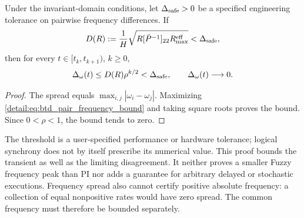 \begin{btdcorollary}
\label{detail:cor:btd_frequency_safety}
Under the invariant-domain conditions, let $\Delta_{\rm safe}>0$ be a
specified engineering tolerance on pairwise frequency differences. If
\begin{equation}
 D(R):=\frac1H\sqrt{R[\bar P^{-1}]_{22}R_{\max}^{\rm eff}}
       <\Delta_{\rm safe},
 \label{detail:eq:btd_frequency_threshold_condition}
\end{equation}
then for every $t\in[t_k,t_{k+1})$, $k\ge0$,
\begin{equation}
 \Delta_\omega(t)\le D(R)\rho^{k/2}<\Delta_{\rm safe},
 \qquad \Delta_\omega(t)\longrightarrow0.
 \label{detail:eq:btd_frequency_decay}
\end{equation}
\end{btdcorollary}
\begin{proof}
The spread equals $\max_{i,j}|\omega_i-\omega_j|$. Maximizing
\eqref{detail:eq:btd_pair_frequency_bound} and taking square roots proves
the bound. Since $0<\rho<1$, the bound tends to zero.
\end{proof}

The threshold is a user-specified performance or hardware tolerance;
logical synchrony does not by itself prescribe its numerical value.
This proof bounds the transient as well as the limiting disagreement.
It neither proves a smaller Fuzzy frequency peak than PI nor adds a
guarantee for arbitrary delayed or stochastic executions. Frequency
spread also cannot certify positive absolute frequency: a collection of
equal nonpositive rates would have zero spread. The common frequency
must therefore be bounded separately.

